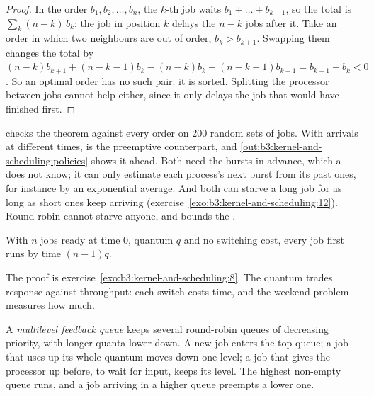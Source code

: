 \begin{proof}
In the order $b_1, b_2, \dots, b_n$, the $k$-th job waits $b_1 + \dots + b_{k-1}$, so the total  is $\sum_{k} (n - k)\, b_k$: the job in position $k$ delays the $n - k$ jobs after it. Take an order in which two neighbours are out of order, $b_k > b_{k+1}$. Swapping them changes the total by $(n - k) b_{k+1} + (n - k - 1) b_k - (n - k) b_k - (n - k - 1) b_{k+1} = b_{k+1} - b_k < 0$. So an optimal order has no such pair: it is sorted. Splitting the processor between jobs cannot help either, since it only delays the job that would have finished first.
\end{proof}

 checks the theorem against every order on 200 random sets of jobs. With arrivals at different times,  is the preemptive counterpart, and \cref{out:b3:kernel-and-scheduling:policies} shows it ahead. Both need the bursts in advance, which a  does not know; it can only estimate each process's next burst from its past ones, for instance by an exponential average. And both can starve a long job for as long as short ones keep arriving (exercise~\ref{exo:b3:kernel-and-scheduling:12}). Round robin cannot starve anyone, and bounds the .

\begin{theorem}\label{thm:b3:kernel-and-scheduling:rr}
With $n$ jobs ready at time 0, quantum $q$ and no switching cost, every job first runs by time $(n - 1)q$.
\end{theorem}

The proof is exercise~\ref{exo:b3:kernel-and-scheduling:8}. The quantum trades response against throughput: each switch costs time, and the weekend problem measures how much.

\begin{definition}\label{def:b3:kernel-and-scheduling:mlfq}
A \emph{multilevel feedback queue} keeps several round-robin queues of decreasing priority, with longer quanta lower down. A new job enters the top queue; a job that uses up its whole quantum moves down one level; a job that gives the processor up before, to wait for input, keeps its level. The highest non-empty queue runs, and a job arriving in a higher queue preempts a lower one.
\end{definition}

